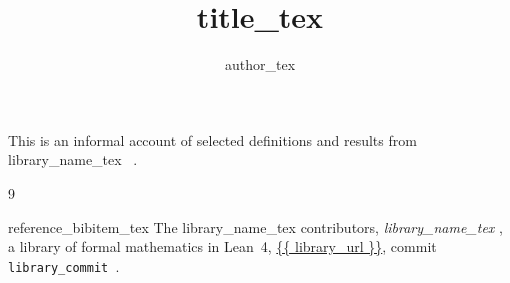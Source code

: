 \documentclass[11pt]{article}
\title{{{ title_tex }}}
\author{{{ author_tex }}}
\date{}
\begin{document}
\maketitle

This is an informal account of selected definitions and results from
{{ library_name_tex }}~\cite{library}.




\begin{thebibliography}{9}
\raggedright
{{ reference_bibitem_tex }}
  The {{ library_name_tex }} contributors, \emph{{{ library_name_tex }}}, a library of
  formal mathematics in Lean~4, \url{{{ library_url }}}, commit
  \texttt{{{ library_commit }}}.
\end{thebibliography}
\end{document}
